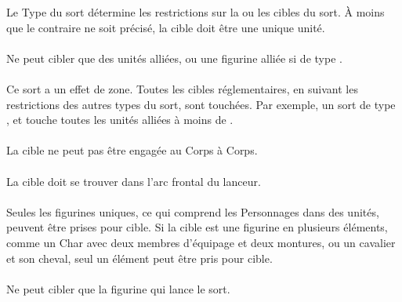 Le Type du sort détermine les restrictions sur la ou les cibles du sort. À moins que le contraire ne soit précisé, la cible doit être une unique unité.

\paragraph{\augment}

Ne peut cibler que des unités alliées, ou une figurine alliée si de type \focused{}.

\paragraph{\aura}

Ce sort a un effet de zone. Toutes les cibles réglementaires, en suivant les restrictions des autres types du sort, sont touchées. Par exemple, un sort de type \aura{}, \augment{} et  touche toutes les unités alliées à moins de .

\paragraph{\damage}

La cible ne peut pas être engagée au Corps à Corps.

\paragraph{\direct}

La cible doit se trouver dans l'arc frontal du lanceur.

\paragraph{\focused}

Seules les figurines uniques, ce qui comprend les Personnages dans des unités, peuvent être prises pour cible. Si la cible est une figurine en plusieurs éléments, comme un Char avec deux membres d'équipage et deux montures, ou un cavalier et son cheval, seul un élément peut être pris pour cible.

\paragraph{\caster}

Ne peut cibler que la figurine qui lance le sort.

\paragraph{\hex}

